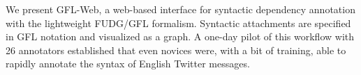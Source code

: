 We present GFL-Web, a web-based interface for syntactic dependency annotation with the lightweight FUDG/GFL formalism. Syntactic attachments are specified in GFL notation and visualized as a graph. A one-day pilot of this workflow with 26 annotators established that even novices were, with a bit of training, able to rapidly annotate the syntax of English Twitter messages.
